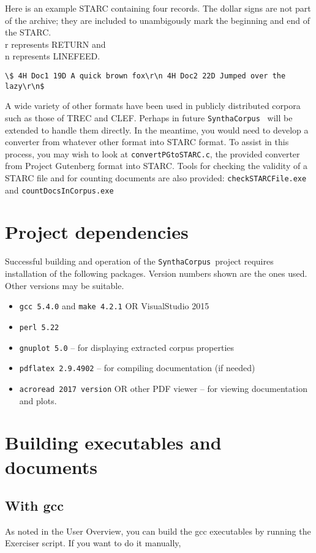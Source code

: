 \documentclass{article}
\newcommand{\projectName}{\texttt{SynthaCorpus}}
\begin{document}
Here is an example STARC containing four records.  The dollar signs are not
part of the archive; they are included to unambigously mark the beginning and end of
the STARC.  \\r represents RETURN and \\n represents LINEFEED.
\begin{verbatim}
\$ 4H Doc1 19D A quick brown fox\r\n 4H Doc2 22D Jumped over the lazy\r\n$
\end{verbatim}

A wide variety of other formats have been used in publicly distributed
corpora such as those of TREC and CLEF.  Perhaps in future
\projectName~ will be extended to handle them directly.  In the
meantime, you would need to develop a converter from whatever other format
into STARC format.  To assist in this process, you may wish to look at
\texttt{convertPGtoSTARC.c}, the provided  converter from
Project Gutenberg format into STARC. Tools for checking the validity
of a STARC file and for counting documents are also provided:
\texttt{checkSTARCFile.exe} and
\texttt{countDocsInCorpus.exe}


\section{Project dependencies}
Successful building and operation of the \projectName~project requires
installation of the following packages.  Version numbers shown are the
ones used.  Other versions may be suitable.

\begin{itemize}
\item \texttt{gcc 5.4.0} and \texttt{make 4.2.1} OR VisualStudio 2015
\item \texttt{perl 5.22}
  \item \texttt{gnuplot 5.0} -- for displaying extracted corpus properties
  \item \texttt{pdflatex 2.9.4902} -- for compiling documentation (if needed)
    \item \texttt{acroread 2017 version} OR other PDF viewer -- for viewing documentation
      and plots.
\end{itemize}



\section{Building executables and documents}

\subsection{With gcc}
As noted in the User Overview, you can build the gcc executables by
running the Exerciser script.  If you want to do it manually,
\end{document}
